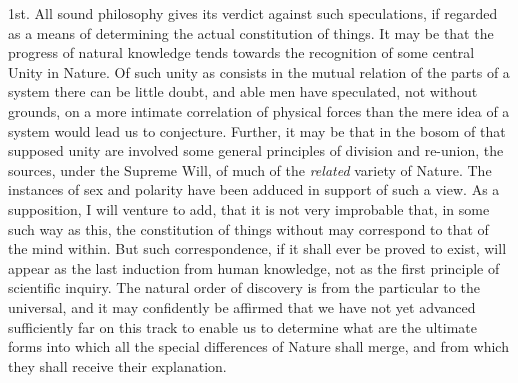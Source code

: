 \documentclass[oneside]{book}
\begin{document}
1st. All sound philosophy gives its verdict against such speculations,
if regarded as a means of determining the actual constitution
of things. It may be that the progress of natural
knowledge tends towards the recognition of some central Unity
in Nature. Of such unity as consists in the mutual relation of
the parts of a system there can be little doubt, and able men
have speculated, not without grounds, on a more intimate correlation
of physical forces than the mere idea of a system would
lead us to conjecture. Further, it may be that in the bosom of
that supposed unity are involved some general principles of division
and re-union, the sources, under the Supreme Will, of much
of the \emph{related} variety of Nature. The instances of sex and polarity
have been adduced in support of such a view. As a supposition,
I will venture to add, that it is not very improbable
that, in some such way as this, the constitution of things without
may correspond to that of the mind within. But such correspondence,
if it shall ever be proved to exist, will appear as the
last induction from human knowledge, not as the first principle
of scientific inquiry. The natural order of discovery is from the
particular to the universal, and it may confidently be affirmed
that we have not yet advanced sufficiently far on this track to
enable us to determine what are the ultimate forms into which all
the special differences of Nature shall merge, and from which
they shall receive their explanation.
\end{document}
